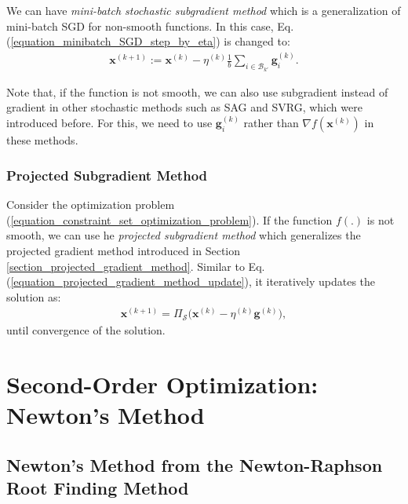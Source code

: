 \documentclass[lang=cn,10pt]{gorgeousnbook}
\numberwithin{equation}{section}%
\numberwithin{figure}{section}%
\begin{document}
We can have \textit{mini-batch stochastic subgradient method} which is a generalization of mini-batch SGD for non-smooth functions. In this case, Eq. (\ref{equation_minibatch_SGD_step_by_eta}) is changed to:
\begin{align}\label{equation_minibatch_SGD_step_by_eta_subgradient}
\boldsymbol{x}^{(k+1)} := \boldsymbol{x}^{(k)} - \eta^{(k)} \frac{1}{b} \sum_{i \in \mathcal{B}_{k'}} \boldsymbol{g}_i^{(k)}.
\end{align}

Note that, if the function is not smooth, we can also use subgradient instead of gradient in other stochastic methods such as SAG and SVRG, which were introduced before. For this, we need to use $\boldsymbol{g}_i^{(k)}$ rather than $\nabla f(\boldsymbol{x}^{(k)})$ in these methods. 


\subsubsection{Projected Subgradient Method}

Consider the optimization problem (\ref{equation_constraint_set_optimization_problem}).
If the function $f(.)$ is not smooth, we can use he \textit{projected subgradient method} \cite{alber1998projected} which generalizes the projected gradient method introduced in Section \ref{section_projected_gradient_method}. Similar to Eq. (\ref{equation_projected_gradient_method_update}), it iteratively updates the solution as:
\begin{align}
\boldsymbol{x}^{(k+1)} = \Pi_{\mathcal{S}}\big(\boldsymbol{x}^{(k)} - \eta^{(k)} \boldsymbol{g}^{(k)}\big),
\end{align}
until convergence of the solution. 

\section{Second-Order Optimization: Newton's Method}\label{section_second_order_methods}

\subsection{Newton's Method from the Newton-Raphson Root Finding Method}
\end{document}
